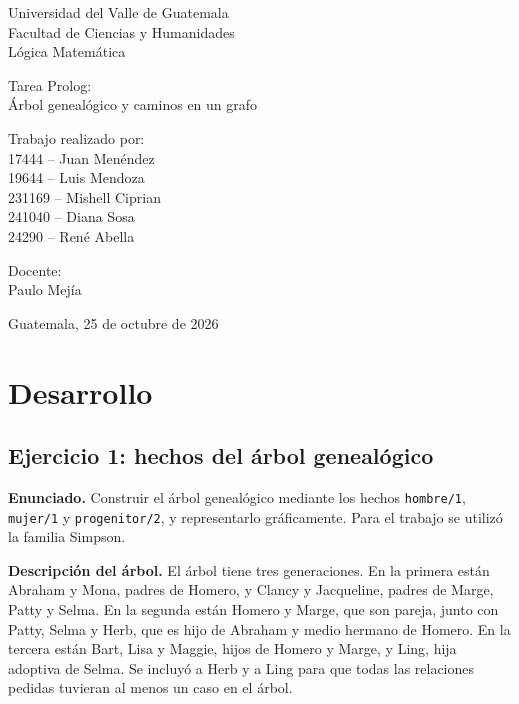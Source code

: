 \documentclass[12pt,letterpaper]{article}
\begin{document}
\begin{titlepage}
\noindent Universidad del Valle de Guatemala\\
Facultad de Ciencias y Humanidades\\
Lógica Matemática

\vspace*{3cm}

\begin{center}
{\Large Tarea Prolog:}\\[0.5cm]
{\large Árbol genealógico y caminos en un grafo}

\vspace{1.5cm}

Trabajo realizado por:\\
17444 -- Juan Menéndez\\
19644 -- Luis Mendoza\\
231169 -- Mishell Ciprian\\
241040 -- Diana Sosa\\
24290 -- René Abella

\vspace{1cm}

Docente:\\
Paulo Mejía

\vspace{1.5cm}

Guatemala, 25 de octubre de 2026
\end{center}
\end{titlepage}

\section{Desarrollo}

\subsection{Ejercicio 1: hechos del árbol genealógico}

\noindent\textbf{Enunciado.} Construir el árbol genealógico mediante los hechos
\texttt{hombre/1}, \texttt{mujer/1} y \texttt{progenitor/2}, y representarlo
gráficamente. Para el trabajo se utilizó la familia Simpson.

\noindent\textbf{Descripción del árbol.} El árbol tiene tres generaciones. En la primera
están Abraham y Mona, padres de Homero, y Clancy y Jacqueline, padres de Marge,
Patty y Selma. En la segunda están Homero y Marge, que son pareja, junto con
Patty, Selma y Herb, que es hijo de Abraham y medio hermano de Homero. En la
tercera están Bart, Lisa y Maggie, hijos de Homero y Marge, y Ling, hija adoptiva
de Selma. Se incluyó a Herb y a Ling para que todas las relaciones pedidas
tuvieran al menos un caso en el árbol.
\end{document}
